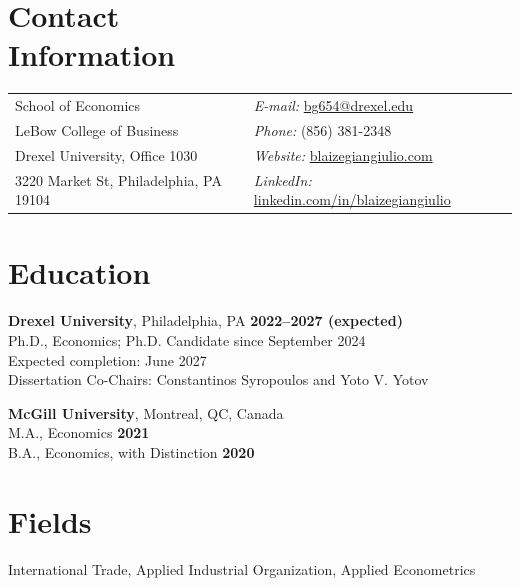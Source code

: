 \documentclass[margin,line]{res}
\newcommand{\entrygap}{\vspace{.09in}}
\begin{document}

\begin{resume}

\section{\sc Contact\\ Information}
\vspace{.05in}
\begin{tabular}{@{}p{2.55in}p{2.6in}}
School of Economics                  & {\it E-mail:} \href{mailto:bg654@drexel.edu}{bg654@drexel.edu} \\
LeBow College of Business            & {\it Phone:} (856) 381-2348 \\
Drexel University, Office 1030       & {\it Website:} \href{https://blaizegiangiulio.com}{blaizegiangiulio.com} \\
3220 Market St, Philadelphia, PA 19104 & {\it LinkedIn:} \href{https://www.linkedin.com/in/blaizegiangiulio}{linkedin.com/in/blaizegiangiulio} \\
\end{tabular}

\section{\sc Education}
{\bf Drexel University}, Philadelphia, PA \hfill {\bf 2022--2027 (expected)}\\
Ph.D., Economics; Ph.D. Candidate since September 2024\\
Expected completion: June 2027\\
Dissertation Co-Chairs: Constantinos Syropoulos and Yoto V. Yotov

\entrygap
{\bf McGill University}, Montreal, QC, Canada\\
M.A., Economics \hfill {\bf 2021}\\
B.A., Economics, with Distinction \hfill {\bf 2020}

\section{\sc Fields}
International Trade, Applied Industrial Organization, Applied Econometrics


\end{resume}
\end{document}
